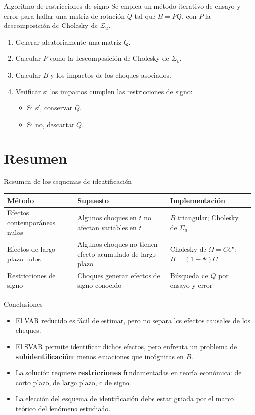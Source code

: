 \documentclass[11pt]{beamer}
\begin{document}
\begin{frame}{Algoritmo de restricciones de signo}
Se emplea un método iterativo de ensayo y error para hallar una matriz de rotación $Q$ tal que $B = PQ$, con $P$ la descomposición de Cholesky de $\Sigma_u$.

\begin{enumerate}
    \item Generar aleatoriamente una matriz $Q$.
    \item Calcular $P$ como la descomposición de Cholesky de $\Sigma_u$.
    \item Calcular $B$ y los impactos de los choques asociados.
    \item Verificar si los impactos cumplen las restricciones de signo:
    \begin{itemize}
        \item Si sí, conservar $Q$.
        \item Si no, descartar $Q$.
    \end{itemize}
\end{enumerate}
\end{frame}

\section{Resumen}

\begin{frame}{Resumen de los esquemas de identificación}
\small
\begin{tabular}{p{3cm}p{4.3cm}p{3.2cm}}
\toprule
\textbf{Método} & \textbf{Supuesto} & \textbf{Implementación} \\
\midrule
Efectos contemporáneos nulos & Algunos choques en $t$ no afectan variables en $t$ & $B$ triangular; Cholesky de $\Sigma_u$ \\
Efectos de largo plazo nulos & Algunos choques no tienen efecto acumulado de largo plazo & Cholesky de $\Omega=CC'$; $B=(1-\Phi)C$ \\
Restricciones de signo & Choques generan efectos de signo conocido & Búsqueda de $Q$ por ensayo y error \\
\bottomrule
\end{tabular}
\end{frame}

\begin{frame}{Conclusiones}
\begin{itemize}
    \item El VAR reducido es fácil de estimar, pero no separa los efectos causales de los choques.
    \item El SVAR permite identificar dichos efectos, pero enfrenta un problema de \textbf{subidentificación}: menos ecuaciones que incógnitas en $B$.
    \item La solución requiere \textbf{restricciones} fundamentadas en teoría económica: de corto plazo, de largo plazo, o de signo.
    \item La elección del esquema de identificación debe estar guiada por el marco teórico del fenómeno estudiado.
\end{itemize}
\end{frame}
\end{document}
